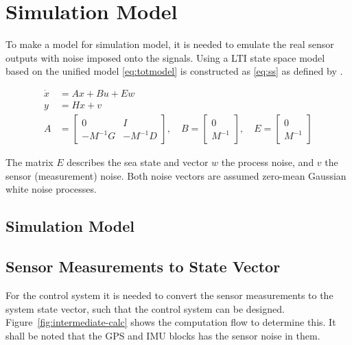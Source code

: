 \chapter{Simulation Model}
\label{ch:simulation-model}

To make a model for simulation model, it is needed to emulate the real
sensor outputs with noise imposed onto the signals. Using a \ac{LTI}
state space model based on the unified model \vref{eq:totmodel} is
constructed as \vref{eq:ss} as defined by \citep[p. 175]{fossen}.

\begin{subequations}
\begin{align}
	\dot x &=  A x + B u + E w \\
	y &= H x + v \\
	A &=
	\begin{bmatrix}
		0 & I\\ -M^{-1}G & -M^{-1}D
	\end{bmatrix}, \quad
	B = 
	\begin{bmatrix}
		0 \\ M^{-1}
	\end{bmatrix}, \quad
	E =
	\begin{bmatrix}
		0 \\ M^{-1}
	\end{bmatrix}
\end{align}
\label{eq:ss}
\end{subequations}

The matrix $E$ describes the sea state and vector $w$ the process noise, and $v$ the sensor (measurement) noise. Both noise
vectors are assumed zero-mean Gaussian white noise processes.


\section{Simulation Model}

\section{Sensor Measurements to State Vector}
For the control system it is needed to convert the sensor measurements
to the system state vector, such that the control system can be
designed. Figure~\vref{fig:intermediate-calc} shows the computation
flow to determine this. It shall be noted that the \ac{GPS} and
\ac{IMU} blocks has the sensor noise in them.


